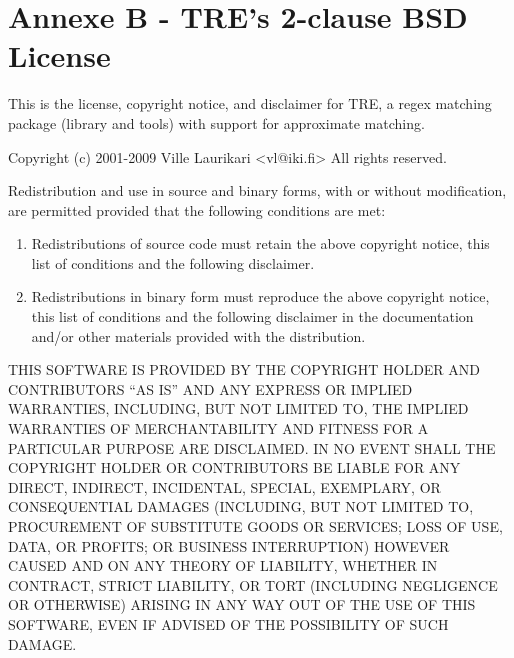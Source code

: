 \chapter*{Annexe B - TRE's 2-clause BSD License}


\noindent This is the license, copyright notice, and disclaimer for TRE, a regex
matching package (library and tools) with support for approximate
matching.

\bigskip
\noindent Copyright (c) 2001-2009 Ville Laurikari <vl@iki.fi>
All rights reserved.

\bigskip
\noindent Redistribution and use in source and binary forms, with or without
modification, are permitted provided that the following conditions
are met:

\begin{enumerate}
  \item 
  Redistributions of source code must retain the above copyright
     notice, this list of conditions and the following disclaimer.

\item 
  Redistributions in binary form must reproduce the above copyright
     notice, this list of conditions and the following disclaimer in the
     documentation and/or other materials provided with the distribution.
\end{enumerate}

\bigskip
\noindent THIS SOFTWARE IS PROVIDED BY THE COPYRIGHT HOLDER AND CONTRIBUTORS
``AS IS'' AND ANY EXPRESS OR IMPLIED WARRANTIES, INCLUDING, BUT NOT
LIMITED TO, THE IMPLIED WARRANTIES OF MERCHANTABILITY AND FITNESS FOR
A PARTICULAR PURPOSE ARE DISCLAIMED.  IN NO EVENT SHALL THE COPYRIGHT
HOLDER OR CONTRIBUTORS BE LIABLE FOR ANY DIRECT, INDIRECT, INCIDENTAL,
SPECIAL, EXEMPLARY, OR CONSEQUENTIAL DAMAGES (INCLUDING, BUT NOT
LIMITED TO, PROCUREMENT OF SUBSTITUTE GOODS OR SERVICES; LOSS OF USE,
DATA, OR PROFITS; OR BUSINESS INTERRUPTION) HOWEVER CAUSED AND ON ANY
THEORY OF LIABILITY, WHETHER IN CONTRACT, STRICT LIABILITY, OR TORT
(INCLUDING NEGLIGENCE OR OTHERWISE) ARISING IN ANY WAY OUT OF THE USE
OF THIS SOFTWARE, EVEN IF ADVISED OF THE POSSIBILITY OF SUCH DAMAGE.


